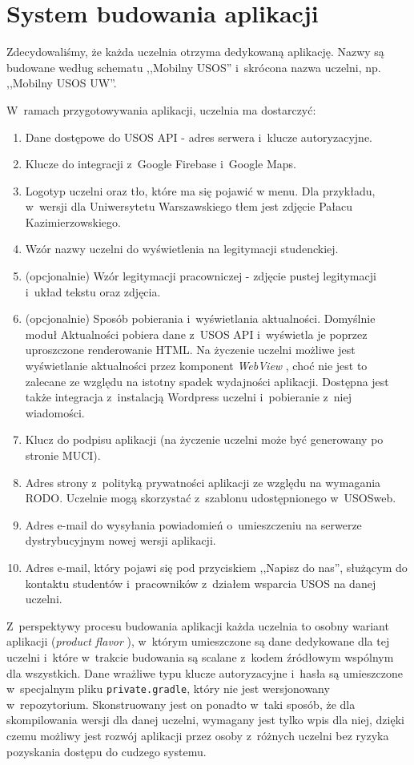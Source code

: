 \documentclass{pracamgr}
\begin{document}
\section{System budowania aplikacji}

Zdecydowaliśmy, że każda uczelnia otrzyma dedykowaną aplikację. Nazwy są budowane według schematu ,,Mobilny USOS'' i~skrócona nazwa uczelni, np. ,,Mobilny USOS UW''. 

W~ramach przygotowywania aplikacji, uczelnia ma dostarczyć:
\begin{enumerate}
	\item Dane dostępowe do USOS API - adres serwera i~klucze autoryzacyjne.
	\item Klucze do integracji z~Google Firebase i~Google Maps.
	\item Logotyp uczelni oraz tło, które ma się pojawić w menu. Dla przykładu, w~wersji dla Uniwersytetu Warszawskiego
        tłem jest zdjęcie Pałacu Kazimierzowskiego.
	\item Wzór nazwy uczelni do wyświetlenia na legitymacji studenckiej.
	\item (opcjonalnie) Wzór legitymacji pracowniczej - zdjęcie pustej legitymacji i~układ tekstu oraz zdjęcia.
	\item (opcjonalnie) Sposób pobierania i~wyświetlania aktualności. Domyślnie moduł Aktualności pobiera dane z~USOS
        API i~wyświetla je poprzez uproszczone renderowanie HTML. Na życzenie uczelni możliwe jest wyświetlanie
        aktualności przez komponent \textit{WebView} \cite{webview}, choć nie jest to zalecane ze względu na istotny
        spadek wydajności aplikacji. Dostępna jest także integracja z~instalacją Wordpress uczelni i~pobieranie z~niej wiadomości.
	\item Klucz do podpisu aplikacji (na życzenie uczelni może być generowany po stronie MUCI).
	\item Adres strony z~polityką prywatności aplikacji ze względu na wymagania RODO. Uczelnie mogą skorzystać z~szablonu udostępnionego w~USOSweb.
	\item Adres e-mail do wysyłania powiadomień o~umieszczeniu na serwerze dystrybucyjnym nowej wersji aplikacji.
	\item Adres e-mail, który pojawi się pod przyciskiem ,,Napisz do nas'', służącym do kontaktu studentów i~pracowników z~działem wsparcia USOS na danej uczelni.
\end{enumerate}

Z~perspektywy procesu budowania aplikacji każda uczelnia to osobny wariant aplikacji 
(\textit{product flavor} \cite{product-flavor}), w~którym umieszczone są dane dedykowane dla tej uczelni i~które w~trakcie
budowania są scalane z~kodem źródłowym wspólnym dla wszystkich. Dane wrażliwe typu klucze autoryzacyjne i~hasła są
umieszczone w~specjalnym pliku \texttt{private.gradle}, który nie jest wersjonowany w~repozytorium. Skonstruowany jest on
ponadto w~taki sposób, że dla skompilowania wersji dla danej uczelni, wymagany jest tylko wpis dla niej, dzięki czemu
możliwy jest rozwój aplikacji przez osoby z~różnych uczelni bez ryzyka pozyskania dostępu do cudzego systemu.
\end{document}
